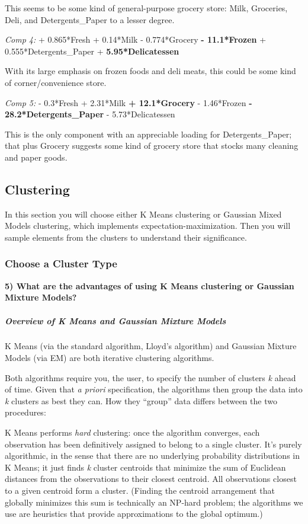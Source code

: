 \documentclass{article}
\begin{document}
This seems to be some kind of general-purpose grocery store: Milk,
Groceries, Deli, and Detergents\_Paper to a lesser degree.

\emph{Comp 4:} + 0.865*Fresh + 0.14*Milk - 0.774*Grocery \textbf{-
11.1*Frozen} + 0.555*Detergents\_Paper + \textbf{5.95*Delicatessen}

With its large emphasis on frozen foods and deli meats, this could be
some kind of corner/convenience store.

\emph{Comp 5:} - 0.3*Fresh + 2.31*Milk \textbf{+ 12.1*Grocery} -
1.46*Frozen \textbf{- 28.2*Detergents\_Paper} - 5.73*Delicatessen

This is the only component with an appreciable loading for
Detergents\_Paper; that plus Grocery suggests some kind of grocery store
that stocks many cleaning and paper goods.

    \subsection{Clustering}\label{clustering}

In this section you will choose either K Means clustering or Gaussian
Mixed Models clustering, which implements expectation-maximization. Then
you will sample elements from the clusters to understand their
significance.

    \subsubsection{Choose a Cluster Type}\label{choose-a-cluster-type}

\textbf{5) What are the advantages of using K Means clustering or
Gaussian Mixture Models?}

    \subparagraph{Overview of K Means and Gaussian Mixture
Models}\label{overview-of-k-means-and-gaussian-mixture-models}

K Means (via the standard algorithm, Lloyd's algorithm) and Gaussian
Mixture Models (via EM) are both iterative clustering algorithms.

Both algorithms require you, the user, to specify the number of clusters
\emph{k} ahead of time. Given that \emph{a priori} specification, the
algorithms then group the data into \emph{k} clusters as best they can.
How they ``group'' data differs between the two procedures:

K Means performs \emph{hard} clustering: once the algorithm converges,
each observation has been definitively assigned to belong to a single
cluster. It's purely algorithmic, in the sense that there are no
underlying probability distributions in K Means; it just finds \emph{k}
cluster centroids that minimize the sum of Euclidean distances from the
observations to their closest centroid. All observations closest to a
given centroid form a cluster. (Finding the centroid arrangement that
globally minimizes this sum is technically an NP-hard problem; the
algorithms we use are heuristics that provide approximations to the
global optimum.)
\end{document}
